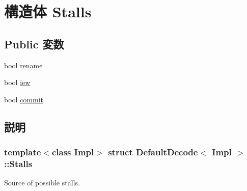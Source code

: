 \hypertarget{structDefaultDecode_1_1Stalls}{
\section{構造体 Stalls}
\label{structDefaultDecode_1_1Stalls}
}
\subsection*{Public 変数}
\begin{DoxyCompactItemize}
\item 
bool \hyperlink{structDefaultDecode_1_1Stalls_a5e8e124987c56967514ad546a9f9c09b}{rename}
\item 
bool \hyperlink{structDefaultDecode_1_1Stalls_a69f40ab12e9825ce316dfa72651a7404}{iew}
\item 
bool \hyperlink{structDefaultDecode_1_1Stalls_ad7d6b839c43385b5fffdf2beaff214ec}{commit}
\end{DoxyCompactItemize}


\subsection{説明}
\subsubsection*{template$<$class Impl$>$ struct DefaultDecode$<$ Impl $>$::Stalls}

Source of possible stalls. 

